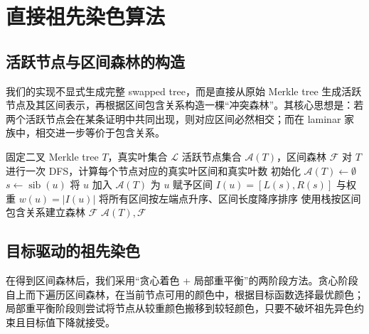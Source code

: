 \documentclass[UTF8]{ctexart}
\begin{document}
	\section{直接祖先染色算法}
	
	\subsection{活跃节点与区间森林的构造}
	
	我们的实现不显式生成完整 swapped tree，而是直接从原始 Merkle tree 生成活跃节点及其区间表示，再根据区间包含关系构造一棵“冲突森林”。其核心思想是：若两个活跃节点会在某条证明中共同出现，则对应区间必然相交；而在 laminar 家族中，相交进一步等价于包含关系。
	
	\begin{algorithm}[H]
		\caption{活跃节点与区间森林构造}
		\label{alg:build}
		\begin{algorithmic}[1]
			\Require 固定二叉 Merkle tree $T$，真实叶集合 $\mathcal{L}$
			\Ensure 活跃节点集合 $\mathcal{A}(T)$，区间森林 $\mathcal{F}$
			\State 对 $T$ 进行一次 DFS，计算每个节点对应的真实叶区间和真实叶数
			\State 初始化 $\mathcal{A}(T)\gets \emptyset$
			\State $s \gets \operatorname{sib}(u)$
			\State 将 $u$ 加入 $\mathcal{A}(T)$
			\State 为 $u$ 赋予区间 $I(u)=[L(s),R(s)]$ 与权重 $w(u)=|I(u)|$
			\EndIf
			\EndFor
			\State 将所有区间按左端点升序、区间长度降序排序
			\State 使用栈按区间包含关系建立森林 $\mathcal{F}$
			\State \Return $\mathcal{A}(T),\mathcal{F}$
		\end{algorithmic}
	\end{algorithm}
	
	\subsection{目标驱动的祖先染色}
	
	在得到区间森林后，我们采用“贪心着色 + 局部重平衡”的两阶段方法。贪心阶段自上而下遍历区间森林，在当前节点可用的颜色中，根据目标函数选择最优颜色；局部重平衡阶段则尝试将节点从较重颜色搬移到较轻颜色，只要不破坏祖先异色约束且目标值下降就接受。
	
\end{document}
